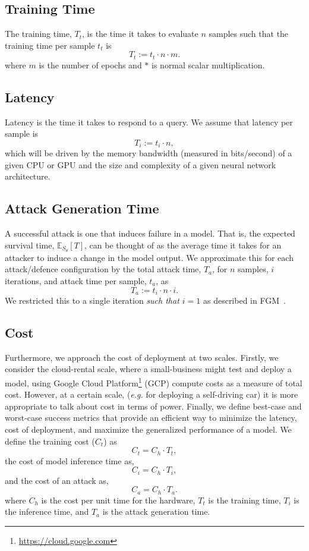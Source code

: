 \documentclass[conference]{IEEEtran}
\newcommand{\cm}[1]{\textit{{\color{blue}#1}}}
\begin{document}
\subsection{Training Time}
The training time, $T_t$, is the time it takes to evaluate $n$ samples such that the training time per sample $t_t$ is
$$
    T_t := t_t \cdot n  \cdot m.
$$
where $m$ is the number of epochs and $*$ is normal scalar multiplication.

\subsection{Latency}
Latency is the time it takes to respond to a query. We assume that latency per sample is
$$
    T_i := t_i \cdot n,
$$
which will be driven by the memory bandwidth (measured in bits/second) of a given CPU or GPU and the size\cite{vgg} and complexity\cite{resnet} of a given neural network architecture.


\subsection{Attack Generation Time}
A successful attack is one that induces failure in a model. That is, the expected survival time, $\mathbb{E}_{S_\theta}[T]$, can be thought of as the average time it takes for an attacker to induce a change in the model output. We approximate this for each attack/defence configuration by the total attack time, $T_a$, for $n$ samples, $i$ iterations, and attack time per sample, $t_a$, as
\begin{equation}
    \label{attack_time}
    T_a := t_i \cdot n \cdot i.
\end{equation}
We restricted this to a single iteration \cm{such that $i =1$} as described in FGM~\cite{fgm}.


\subsection{Cost}
Furthermore, we approach the cost of deployment at two scales. Firstly, we consider the cloud-rental scale, where a small-business might test and deploy a model, using Google Cloud Platform\footnote{\href{https://cloud.google.com}{https://cloud.google.com}} (GCP) compute costs as a measure of total cost. However, at a certain scale, (\textit{e.g.} for deploying a self-driving car) it is  more appropriate to talk about cost in terms of power. Finally, we define best-case and worst-case success metrics that provide an efficient way to minimize the latency, cost of deployment, and 
maximize the generalized performance of a model. We define the training cost ($C_t$) as
$$
    C_t = C_h \cdot T_t,
    \label{eq:cost_training}
$$
the cost of model inference time as,
$$
    C_i = C_h \cdot T_i,
    \label{eq:cost_inference}
$$
and the cost of an attack as,
$$
    C_a = C_h \cdot T_a.
    \label{eq:cost_attack}
$$
where $C_h$ is the cost per unit time for the hardware, $T_t$ is the training time, $T_i$ is the inference time, and $T_a$ is the attack generation time.
\end{document}
